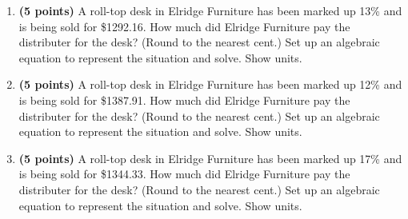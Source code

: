 \documentclass[12pt]{amsart}
\begin{document}
\begin{enumerate}
\vfill 
\def \discount{13}\def \paid{1292.16}\def \rainy{8.90}\def \orcost{1485.24}\def \purcost{1143.50}\def \orrainy{10.23}
\item {\bf (5 points)} 
 A roll-top desk in Elridge Furniture has been marked up \discount\% and is being sold for \$\paid. How much did Elridge Furniture pay the distributer for the desk? (Round to the nearest cent.) Set up an algebraic equation to represent the situation and solve. Show units.

\vfill 
\def \discount{12}\def \paid{1387.91}\def \rainy{14.13}\def \orcost{1577.17}\def \purcost{1239.21}\def \orrainy{16.06}
\item {\bf (5 points)} 
 A roll-top desk in Elridge Furniture has been marked up \discount\% and is being sold for \$\paid. How much did Elridge Furniture pay the distributer for the desk? (Round to the nearest cent.) Set up an algebraic equation to represent the situation and solve. Show units.

\vfill 
\def \discount{17}\def \paid{1344.33}\def \rainy{11.79}\def \orcost{1619.67}\def \purcost{1149.00}\def \orrainy{14.20}
\item {\bf (5 points)} 
 A roll-top desk in Elridge Furniture has been marked up \discount\% and is being sold for \$\paid. How much did Elridge Furniture pay the distributer for the desk? (Round to the nearest cent.) Set up an algebraic equation to represent the situation and solve. Show units.


\end{enumerate}
\end{document}
